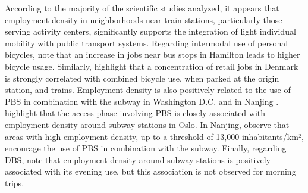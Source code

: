 \begin{refsegment}
According to the majority of the scientific studies analyzed, it appears that employment density in neighborhoods near train stations, particularly those serving activity centers, significantly supports the integration of light individual mobility with public transport systems. Regarding intermodal use of personal bicycles, \textcolor{blue}{\textcite[12]{zuo_promote_2020}} note that an increase in jobs near bus stops in Hamilton leads to higher bicycle usage. Similarly, \textcolor{blue}{\textcite[41]{nielsen_bikeability_2018}} highlight that a concentration of retail jobs in Denmark is strongly correlated with combined bicycle use, when parked at the origin station, and trains. Employment density is also positively related to the use of \acrshort{PBS} in combination with the subway in Washington D.C. \textcolor{blue}{\autocite[7]{ma_bicycle_2015}} and in Nanjing \textcolor{blue}{\autocite[5]{cheng_comparison_2023}}. \textcolor{blue}{\textcite[397]{bocker_bike_2020}} highlight that the access phase involving \acrshort{PBS} is closely associated with employment density around subway stations in Oslo. In Nanjing, \textcolor{blue}{\textcite[8]{cheng_promoting_2022}} observe that areas with high employment density, up to a threshold of 13,000 inhabitants/km², encourage the use of \acrshort{PBS} in combination with the subway. Finally, regarding \acrshort{DBS}, \textcolor{blue}{\textcite[181]{cheng_exploring_2022}} note that employment density around subway stations is positively associated with its evening use, but this association is not observed for morning trips.%


\end{refsegment}
